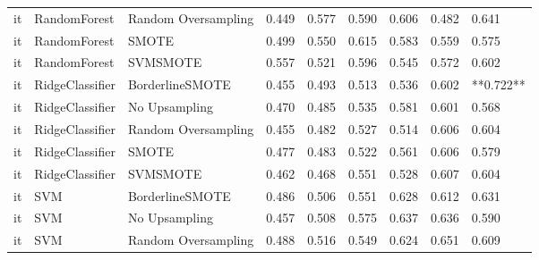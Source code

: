 \begin{tabular}{lllllllll}
      it &                 RandomForest & Random Oversampling & 0.449 &                     0.577 &                 0.590 &                  0.606 &                                   0.482 &     0.641 \\
      it &                 RandomForest &               SMOTE & 0.499 &                     0.550 &                 0.615 &                  0.583 &                                   0.559 &     0.575 \\
      it &                 RandomForest &            SVMSMOTE & 0.557 &                     0.521 &                 0.596 &                  0.545 &                                   0.572 &     0.602 \\
      it &              RidgeClassifier &     BorderlineSMOTE & 0.455 &                     0.493 &                 0.513 &                  0.536 &                                   0.602 & **0.722** \\
      it &              RidgeClassifier &       No Upsampling & 0.470 &                     0.485 &                 0.535 &                  0.581 &                                   0.601 &     0.568 \\
      it &              RidgeClassifier & Random Oversampling & 0.455 &                     0.482 &                 0.527 &                  0.514 &                                   0.606 &     0.604 \\
      it &              RidgeClassifier &               SMOTE & 0.477 &                     0.483 &                 0.522 &                  0.561 &                                   0.606 &     0.579 \\
      it &              RidgeClassifier &            SVMSMOTE & 0.462 &                     0.468 &                 0.551 &                  0.528 &                                   0.607 &     0.604 \\
      it &                          SVM &     BorderlineSMOTE & 0.486 &                     0.506 &                 0.551 &                  0.628 &                                   0.612 &     0.631 \\
      it &                          SVM &       No Upsampling & 0.457 &                     0.508 &                 0.575 &                  0.637 &                                   0.636 &     0.590 \\
      it &                          SVM & Random Oversampling & 0.488 &                     0.516 &                 0.549 &                  0.624 &                                   0.651 &     0.609 \\

\end{tabular}
